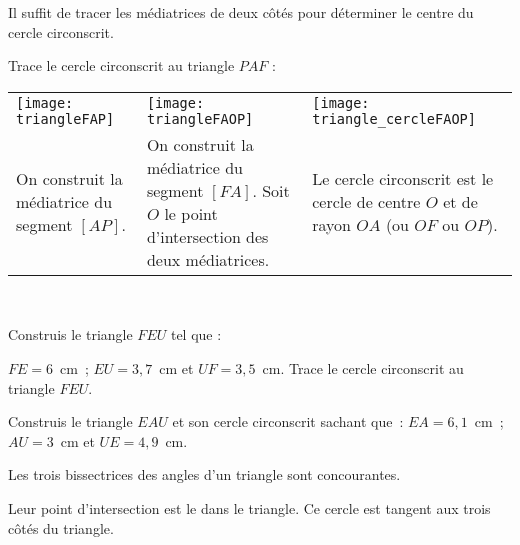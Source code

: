  \vspace{2em}
 
 \begin{methode*1}
 
\begin{remarque}
Il suffit de tracer les médiatrices de deux côtés pour déterminer le centre du cercle circonscrit.
 \end{remarque}
 
 \begin{exemple*1}
Trace le cercle circonscrit au triangle $PAF$ :
 \begin{tabularx}{\textwidth}{X|X|X}
 \texttt{[image: triangleFAP]} &  \texttt{[image: triangleFAOP]} & \texttt{[image: triangle\_cercleFAOP]} \\ 
 On construit la médiatrice du segment $[AP]$. & On construit la médiatrice du segment $[FA]$. Soit $O$ le point d'intersection des deux médiatrices. & Le cercle circonscrit est le cercle de centre $O$ et de rayon $OA$ (ou $OF$ ou $OP$). \\
\end{tabularx} \\

\end{exemple*1}

\exercice
Construis le triangle $FEU$ tel que :

$FE = 6$ cm ; $EU = 3,7$ cm et $UF = 3,5$ cm. Trace le cercle circonscrit au triangle $FEU$.

\exercice
Construis le triangle $EAU$ et son cercle circonscrit sachant que : $EA = 6,1$ cm ; $AU = 3$ cm et $UE = 4,9$ cm.

\end{methode*1}


 
 \newpage
 
 \begin{aconnaitre}
Les trois bissectrices des angles d'un triangle sont concourantes. 

Leur point d'intersection est le  dans le triangle. Ce cercle est tangent aux trois côtés du triangle.
 \end{aconnaitre}
 
 \vspace{2em}
 
